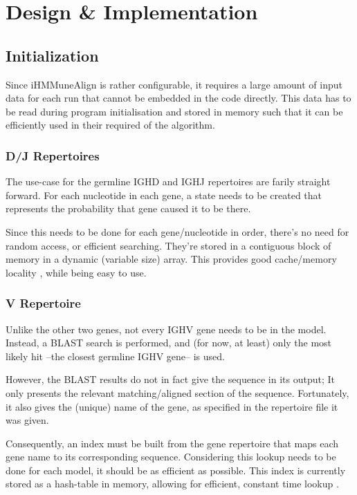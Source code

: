 \chapter{Design \& Implementation}

\section{Initialization}
Since iHMMuneAlign is rather configurable, it requires a large amount of input data for each run that cannot be embedded in the code directly. This data has to be read during program initialisation and stored in memory such that it can be efficiently used in their required of the algorithm.

\subsection{D/J Repertoires}
The use-case for the germline IGHD and IGHJ repertoires are farily straight forward. For each nucleotide in each gene, a state needs to be created that represents the probability that gene caused it to be there.

Since this needs to be done for each gene/nucleotide in order, there's no need for random access, or efficient searching. They're stored in a contiguous block of memory in a dynamic (variable size) array. This provides good cache/memory locality \autocite{cache-locality}, while being easy to use.

\subsection{V Repertoire}
Unlike the other two genes, not every IGHV gene needs to be in the model. Instead, a BLAST search is performed, and (for now, at least) only the most likely hit --the closest germline IGHV gene-- is used.

However, the BLAST results do not in fact give the sequence in its output; It only presents the relevant matching/aligned section of the sequence. Fortunately, it also gives the (unique) name of the gene, as specified in the repertoire file it was given.

Consequently, an index must be built from the gene repertoire that maps each gene name to its corresponding sequence. Considering this lookup needs to be done for each model, it should be as efficient as possible. This index is currently stored as a hash-table in memory, allowing for efficient, constant time lookup \autocite{hash-table}.

